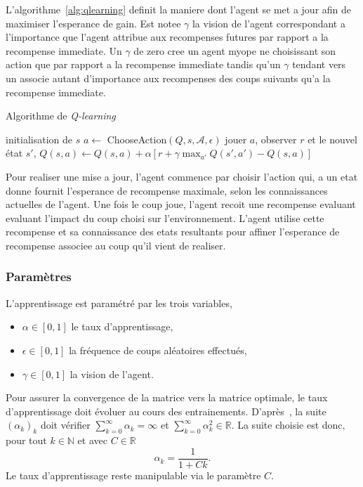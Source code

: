 \documentclass{article}
\newcommand{\R}{\mathbb{R}}
\begin{document}
L'algorithme~\ref{alg:qlearning} definit la maniere dont l'agent se met a jour
afin de maximiser l'esperance de gain. Est notee \(\gamma\) la vision de
l'agent correspondant a l'importance que l'agent attribue aux recompenses
futures par rapport a la recompense immediate. Un \(\gamma\) de zero cree un
agent myope ne choisissant son action que par rapport a la recompense immediate
tandis qu'un \(\gamma\) tendant vers un associe autant d'importance aux
recompenses des coups suivants qu'a la recompense immediate.
\begin{algorithm}
  \caption{Algorithme de \textit{Q-learning}}\label{alg:qlearning}
  \begin{algorithmic}
    [1]
    \Repeat{}
    \State{} initialisation de \(s\)
    \Repeat{}
    \State{} \(a \gets\) ChooseAction$(Q, s, \mathcal{A}, \epsilon)$
    \State{} jouer \(a\), observer \(r\) et le nouvel \'etat \(s'\),
    \State{} \(Q(s, a) \gets Q(s, a) + \alpha\left[ r + \gamma \max_{a'}
      Q(s', a') - Q(s, a)\right]\)
    \EndProcedure{}
  \end{algorithmic}
\end{algorithm}

Pour realiser une mise a jour, l'agent commence par choisir l'action qui, a un
etat donne fournit l'esperance de recompense maximale, selon les connaissances
actuelles de l'agent. Une fois le coup joue, l'agent recoit une recompense
evaluant evaluant l'impact du coup choisi sur l'environnement. L'agent utilise
cette recompense et sa connaissance des etats resultants pour affiner
l'esperance de recompense associee au coup qu'il vient de realiser.

\subsubsection{Param\`etres}
L'apprentissage est paramétré par les trois variables,
\begin{itemize}
  \item \(\alpha \in [0, 1]\) le taux d'apprentissage,
  \item \(\epsilon \in [0, 1]\) la fréquence de coups aléatoires effectués,
  \item \(\gamma \in [0, 1]\) la vision de l'agent.
\end{itemize}
Pour assurer la convergence de la matrice vers la matrice optimale,
le taux d'apprentissage doit évoluer au cours des entrainements.
D'après~\cite{watkins92}, la suite \( (\alpha_k)_k \) doit vérifier
\( \sum_{k=0}^\infty \alpha_k = \infty \) et \(
\sum_{k=0}^\infty \alpha_k^2 \in \R \). La suite choisie est donc, pour tout
\( k \in \mathbb{N} \) et avec \( C \in \R \)
\[
  \alpha_k = \frac{1}{1 + Ck}.
\]
Le taux d'apprentissage reste manipulable via le paramètre \( C \).
\end{document}

